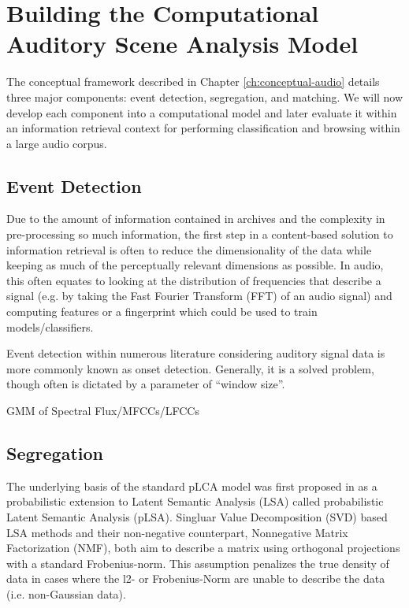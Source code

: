 \documentclass[a4paper,10pt,final]{ThesisStyle}
\begin{document}


\section{Building the Computational Auditory Scene Analysis Model}

The conceptual framework described in Chapter \ref{ch:conceptual-audio} details three major components: event detection, segregation, and matching.  We will now develop each component into a computational model and later evaluate it within an information retrieval context for performing classification and browsing within a large audio corpus.

\subsection{Event Detection}

Due to the amount of information contained in archives and the complexity in pre-processing so much information, the first step in a content-based solution to information retrieval is often to reduce the dimensionality of the data while keeping as much of the perceptually relevant dimensions as possible.  In audio, this often equates to looking at the distribution of frequencies that describe a signal (e.g. by taking the Fast Fourier Transform (FFT) of an audio signal) and computing features or a fingerprint which could be used to train models/classifiers.

Event detection within numerous literature considering auditory signal data is more commonly known as onset detection.  Generally, it is a solved problem, though often is dictated by a parameter of ``window size''.

GMM of Spectral Flux/MFCCs/LFCCs

\subsection{Segregation}
\label{sec:plca}

The underlying basis of the standard pLCA model was first proposed in \cite{Hofmann1999} as a probabilistic extension to Latent Semantic Analysis (LSA) called probabilistic Latent Semantic Analysis (pLSA).  Singluar Value Decomposition (SVD) based LSA methods and their non-negative counterpart, Nonnegative Matrix Factorization (NMF), both aim to describe a matrix using orthogonal projections with a standard Frobenius-norm.  This assumption penalizes the true density of data in cases where the l2- or Frobenius-Norm are unable to describe the data (i.e. non-Gaussian data).  
\end{document}
